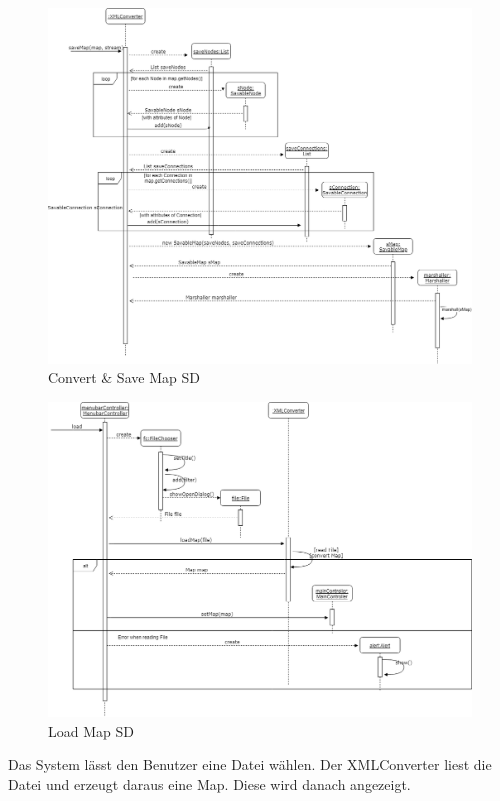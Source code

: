 \begin{figure}[H]
	\centering
		\includegraphics[width=\textwidth]{images/saveConvertSD.png}
	\caption{Convert \& Save Map SD}
	\label{fig:saveConvert_SD}
\end{figure}

\begin{figure}[H]
	\centering
		\includegraphics[width=\textwidth]{images/loadmapSD.png}
	\caption{Load Map SD}
	\label{fig:loadmap_SD}
\end{figure}
Das System lässt den Benutzer eine Datei wählen. Der XMLConverter liest die Datei und erzeugt daraus eine Map. Diese wird danach angezeigt.

